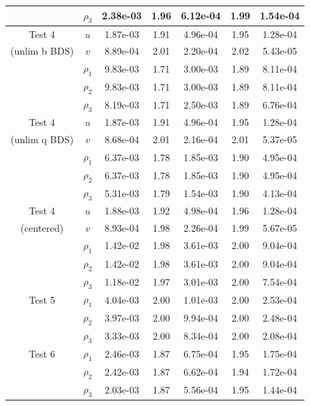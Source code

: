 \documentclass[final]{siamltex}
\begin{document}
\begin{table}[h]
\begin{center}
\begin{tabular}{ccccccc}
                    & $\rho_3$ & 2.38e-03 & 1.96 & 6.12e-04 & 1.99 & 1.54e-04 \\
\hline
Test 4              & $u$      & 1.87e-03 & 1.91 & 4.96e-04 & 1.95 & 1.28e-04 \\
(unlim b BDS)       & $v$      & 8.89e-04 & 2.01 & 2.20e-04 & 2.02 & 5.43e-05 \\
                    & $\rho_1$ & 9.83e-03 & 1.71 & 3.00e-03 & 1.89 & 8.11e-04 \\
                    & $\rho_2$ & 9.83e-03 & 1.71 & 3.00e-03 & 1.89 & 8.11e-04 \\
                    & $\rho_3$ & 8.19e-03 & 1.71 & 2.50e-03 & 1.89 & 6.76e-04 \\
\hline
Test 4              & $u$      & 1.87e-03 & 1.91 & 4.96e-04 & 1.95 & 1.28e-04 \\
(unlim q BDS)       & $v$      & 8.68e-04 & 2.01 & 2.16e-04 & 2.01 & 5.37e-05 \\
                    & $\rho_1$ & 6.37e-03 & 1.78 & 1.85e-03 & 1.90 & 4.95e-04 \\
                    & $\rho_2$ & 6.37e-03 & 1.78 & 1.85e-03 & 1.90 & 4.95e-04 \\
                    & $\rho_3$ & 5.31e-03 & 1.79 & 1.54e-03 & 1.90 & 4.13e-04 \\
\hline
Test 4              & $u$      & 1.88e-03 & 1.92 & 4.98e-04 & 1.96 & 1.28e-04 \\
(centered)          & $v$      & 8.93e-04 & 1.98 & 2.26e-04 & 1.99 & 5.67e-05 \\
                    & $\rho_1$ & 1.42e-02 & 1.98 & 3.61e-03 & 2.00 & 9.04e-04 \\
                    & $\rho_2$ & 1.42e-02 & 1.98 & 3.61e-03 & 2.00 & 9.04e-04 \\
                    & $\rho_3$ & 1.18e-02 & 1.97 & 3.01e-03 & 2.00 & 7.54e-04 \\
\hline
Test 5              & $\rho_1$ & 4.04e-03 & 2.00 & 1.01e-03 & 2.00 & 2.53e-04 \\
                    & $\rho_2$ & 3.97e-03 & 2.00 & 9.94e-04 & 2.00 & 2.48e-04 \\
                    & $\rho_3$ & 3.33e-03 & 2.00 & 8.34e-04 & 2.00 & 2.08e-04 \\
\hline
Test 6              & $\rho_1$ & 2.46e-03 & 1.87 & 6.75e-04 & 1.95 & 1.75e-04 \\
                    & $\rho_2$ & 2.42e-03 & 1.87 & 6.62e-04 & 1.94 & 1.72e-04 \\
                    & $\rho_3$ & 2.03e-03 & 1.87 & 5.56e-04 & 1.95 & 1.44e-04 \\

\end{tabular}
\end{center}
\end{table}
\end{document}
